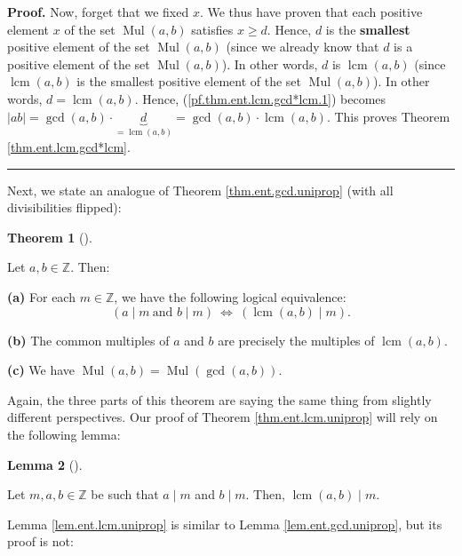 \documentclass[numbers=enddot,12pt,final,onecolumn,notitlepage]{scrartcl}%
\numberwithin{exer}{subsection}
\theoremstyle{definition}
\newtheorem{theo}{Theorem}[subsection]
\newenvironment{theorem}[1][]
{\begin{theo}[#1]\begin{leftbar}}
{\end{leftbar}\end{theo}}
\newtheorem{lem}[theo]{Lemma}
\newenvironment{lemma}[1][]
{\begin{lem}[#1]\begin{leftbar}}
{\end{leftbar}\end{lem}}
\newenvironment{proof}[1][Proof]{\noindent\textbf{#1.} }{\ \rule{0.5em}{0.5em}}
\begin{document}
\begin{proof}
Now, forget that we fixed $x$. We thus have proven that each positive element
$x$ of the set $\operatorname*{Mul}\left(  a,b\right)  $ satisfies $x\geq d$.
Hence, $d$ is the \textbf{smallest} positive element of the set
$\operatorname*{Mul}\left(  a,b\right)  $ (since we already know that $d$ is a
positive element of the set $\operatorname*{Mul}\left(  a,b\right)  $). In
other words, $d$ is $\operatorname{lcm}\left(  a,b\right)  $ (since
$\operatorname{lcm}\left(  a,b\right)  $ is the smallest positive element of
the set $\operatorname*{Mul}\left(  a,b\right)  $). In other words,
$d=\operatorname{lcm}\left(  a,b\right)  $. Hence,
(\ref{pf.thm.ent.lcm.gcd*lcm.1}) becomes $\left\vert ab\right\vert
=\gcd\left(  a,b\right)  \cdot\underbrace{d}_{=\operatorname{lcm}\left(
a,b\right)  }=\gcd\left(  a,b\right)  \cdot\operatorname{lcm}\left(
a,b\right)  $. This proves Theorem \ref{thm.ent.lcm.gcd*lcm}.
\end{proof}

Next, we state an analogue of Theorem \ref{thm.ent.gcd.uniprop} (with all
divisibilities flipped):

\begin{theorem}
\label{thm.ent.lcm.uniprop}Let $a,b\in\mathbb{Z}$. Then:

\textbf{(a)} For each $m\in\mathbb{Z}$, we have the following logical
equivalence:%
\begin{equation}
\left(  a\mid m\ \text{and }b\mid m\right)  \ \Longleftrightarrow\ \left(
\operatorname{lcm}\left(  a,b\right)  \mid m\right)  .
\label{eq.thm.ent.lcm.uniprop.equiv}%
\end{equation}


\textbf{(b)} The common multiples of $a$ and $b$ are precisely the multiples
of $\operatorname{lcm}\left(  a,b\right)  $.

\textbf{(c)} We have $\operatorname*{Mul}\left(  a,b\right)
=\operatorname*{Mul}\left(  \gcd\left(  a,b\right)  \right)  $.
\end{theorem}

Again, the three parts of this theorem are saying the same thing from slightly
different perspectives. Our proof of Theorem \ref{thm.ent.lcm.uniprop} will
rely on the following lemma:

\begin{lemma}
\label{lem.ent.lcm.uniprop}Let $m,a,b\in\mathbb{Z}$ be such that $a\mid m$ and
$b\mid m$. Then, $\operatorname{lcm}\left(  a,b\right)  \mid m$.
\end{lemma}

Lemma \ref{lem.ent.lcm.uniprop} is similar to Lemma \ref{lem.ent.gcd.uniprop},
but its proof is not:
\end{document}
